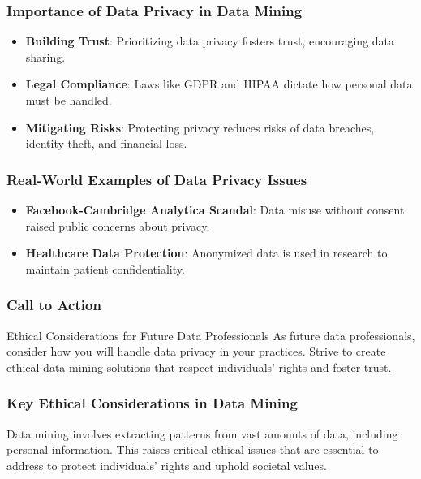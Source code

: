 \documentclass[aspectratio=169]{beamer}
\begin{document}
\begin{frame}[fragile]
    \frametitle{Importance of Data Privacy in Data Mining}
    \begin{itemize}
        \item \textbf{Building Trust}: Prioritizing data privacy fosters trust, encouraging data sharing.
        \item \textbf{Legal Compliance}: Laws like GDPR and HIPAA dictate how personal data must be handled.
        \item \textbf{Mitigating Risks}: Protecting privacy reduces risks of data breaches, identity theft, and financial loss.
    \end{itemize}
\end{frame}

\begin{frame}[fragile]
    \frametitle{Real-World Examples of Data Privacy Issues}
    \begin{itemize}
        \item \textbf{Facebook-Cambridge Analytica Scandal}: Data misuse without consent raised public concerns about privacy.
        \item \textbf{Healthcare Data Protection}: Anonymized data is used in research to maintain patient confidentiality.
    \end{itemize}
\end{frame}

\begin{frame}[fragile]
    \frametitle{Call to Action}
    \begin{block}{Ethical Considerations for Future Data Professionals}
        As future data professionals, consider how you will handle data privacy in your practices.
        Strive to create ethical data mining solutions that respect individuals’ rights and foster trust.
    \end{block}
\end{frame}

\begin{frame}[fragile]
    \frametitle{Key Ethical Considerations in Data Mining}
    Data mining involves extracting patterns from vast amounts of data, including personal information. This raises critical ethical issues that are essential to address to protect individuals' rights and uphold societal values.
\end{frame}
\end{document}
